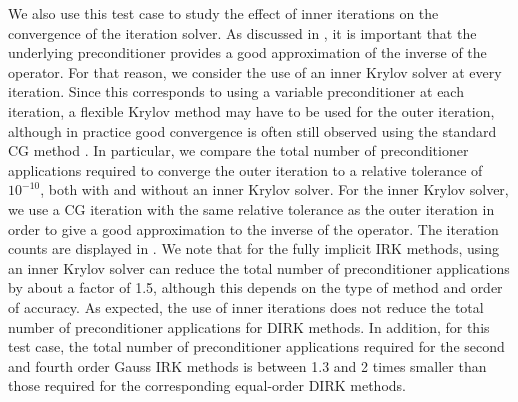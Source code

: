 \documentclass[a4paper,10pt]{article}
\begin{document}
We also use this test case to study the effect of inner iterations on the convergence of the iteration solver.
As discussed in , it is important that the underlying preconditioner provides a good approximation of the inverse of the operator.
For that reason, we consider the use of an inner Krylov solver at every iteration.
Since this corresponds to using a variable preconditioner at each iteration, a flexible Krylov method may have to be used for the outer iteration, although in practice good convergence is often still observed using the standard CG method \cite{Notay2000}.
In particular, we compare the total number of preconditioner applications required to converge the outer iteration to a relative tolerance of $10^{-10}$, both with and without an inner Krylov solver.
For the inner Krylov solver, we use a CG iteration with the same relative tolerance as the outer iteration in order to give a good approximation to the inverse of the operator.
The iteration counts are displayed in .
We note that for the fully implicit IRK methods, using an inner Krylov solver can reduce the total number of preconditioner applications by about a factor of 1.5, although this depends on the type of method and order of accuracy.
As expected, the use of inner iterations does not reduce the total number of preconditioner applications for DIRK methods.
In addition, for this test case, the total number of preconditioner applications required for the second and fourth order Gauss IRK methods is between 1.3 and 2 times smaller than those required for the corresponding equal-order DIRK methods.
\end{document}
